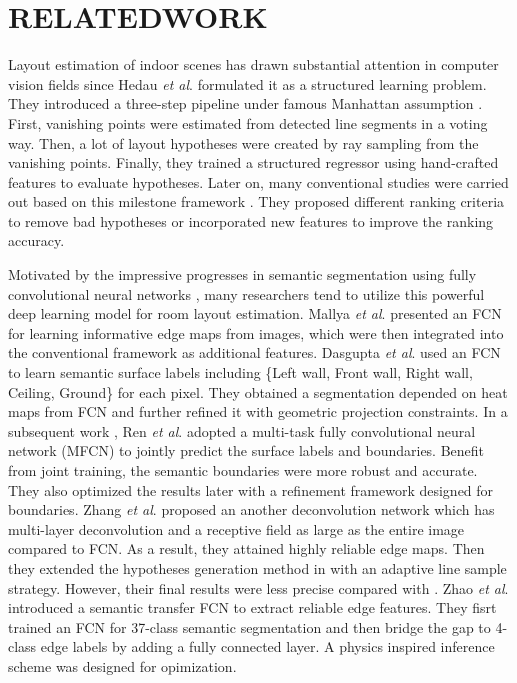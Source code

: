 \section{RELATEDWORK}
\label{sec:Rel}

Layout estimation of indoor scenes has drawn substantial attention in computer vision fields since Hedau \emph{et al}. \cite{hedau2009recovering} formulated it as a structured learning problem. They introduced a three-step pipeline under famous Manhattan assumption \cite{coughlan1999manhattan}. First, vanishing points were estimated from detected line segments in a voting way. Then, a lot of layout hypotheses were created by ray sampling from the vanishing points. Finally, they trained a structured regressor using hand-crafted features to evaluate hypotheses. Later on, many conventional studies were carried out based on this milestone framework \cite{gupta2010estimating, wang2013discriminative,hedau2010thinking,schwing2013box,ramalingam2013manhattan}. They proposed different ranking criteria to remove bad hypotheses or incorporated new features to improve the ranking accuracy. 

Motivated by the impressive progresses in semantic segmentation using fully convolutional neural networks \cite{long2015fully,chen2016deeplab}, many researchers tend to utilize this powerful deep learning model for room layout estimation. 
%
Mallya \emph{et al}. \cite{mallya2015learning} presented an FCN for learning informative edge maps from images, which were then integrated into the conventional framework as additional features. 
%
Dasgupta \emph{et al}. \cite{dasgupta2016delay} used an FCN to learn semantic surface labels including \{Left wall, Front wall, Right wall, Ceiling, Ground\} for each pixel. They obtained a segmentation depended on heat maps from FCN and further refined it with geometric projection constraints.
% 
In a subsequent work \cite{ren2016coarse}, Ren \emph{et al}. adopted a multi-task fully convolutional neural network (MFCN) to jointly predict the surface labels and boundaries. Benefit from joint training, the semantic boundaries were more robust and accurate. They also optimized the results later with a refinement framework designed for boundaries.
% 
Zhang \emph{et al}. \cite{zhang2016learning} proposed an another deconvolution network which has multi-layer deconvolution and a receptive field as large as the entire image compared to FCN. As a result, they attained highly reliable edge maps. Then they extended the hypotheses generation method in \cite{mallya2015learning} with an adaptive line sample strategy. However, their final results were less precise compared with \cite{dasgupta2016delay,ren2016coarse}.
%
Zhao \emph{et al}. \cite{zhao2017physics} introduced a semantic transfer FCN to extract reliable edge features. They fisrt trained an FCN for 37-class semantic segmentation and then bridge the gap to 4-class edge labels by adding a fully connected layer. A physics inspired inference scheme was designed for opimization. 


